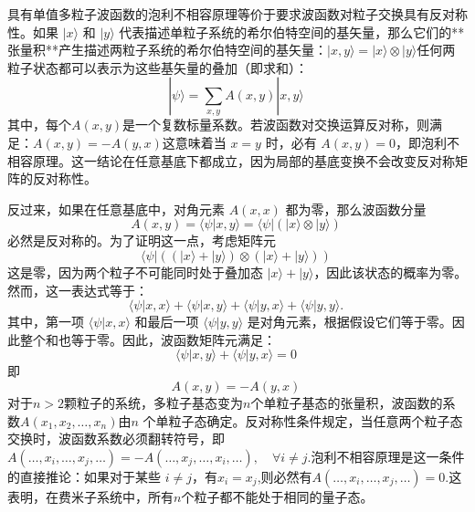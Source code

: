 具有单值多粒子波函数的泡利不相容原理等价于要求波函数对粒子交换具有反对称性。如果 \( |x\rangle \) 和 \( |y\rangle \) 代表描述单粒子系统的希尔伯特空间的基矢量，那么它们的**张量积**产生描述两粒子系统的希尔伯特空间的基矢量：\(|x, y\rangle = |x\rangle \otimes |y\rangle\)任何两粒子状态都可以表示为这些基矢量的叠加（即求和）：  
\[
|\psi\rangle = \sum_{x,y} A(x,y) |x,y\rangle~
\]
其中，每个\(A(x, y)\)是一个复数标量系数。若波函数对交换运算反对称，则满足：\(A(x, y) = -A(y, x)\)这意味着当 \( x = y \) 时，必有 \( A(x, y) = 0 \)，即泡利不相容原理。这一结论在任意基底下都成立，因为局部的基底变换不会改变反对称矩阵的反对称性。

反过来，如果在任意基底中，对角元素 \( A(x, x) \) 都为零，那么波函数分量  
\[
A(x, y) = \langle \psi | x, y \rangle = \langle \psi | ( |x\rangle \otimes |y\rangle )~
\]
必然是反对称的。为了证明这一点，考虑矩阵元  
\[
\langle \psi | ( (|x\rangle + |y\rangle ) \otimes (|x\rangle + |y\rangle ) )~
\]
这是零，因为两个粒子不可能同时处于叠加态 \( |x\rangle + |y\rangle \)，因此该状态的概率为零。然而，这一表达式等于：  
\[
\langle \psi | x, x \rangle + \langle \psi | x, y \rangle + \langle \psi | y, x \rangle + \langle \psi | y, y \rangle.~
\]
其中，第一项 \( \langle \psi | x, x \rangle \) 和最后一项 \( \langle \psi | y, y \rangle \) 是对角元素，根据假设它们等于零。因此整个和也等于零。因此，波函数矩阵元满足：  
\[
\langle \psi | x, y \rangle + \langle \psi | y, x \rangle = 0~
\]
即  
\[
A(x, y) = -A(y, x)~
\]
对于\( n > 2 \)颗粒子的系统，多粒子基态变为\( n \)个单粒子基态的张量积，波函数的系数\(A(x_1, x_2, \dots, x_n)\)由\( n \) 个单粒子态确定。反对称性条件规定，当任意两个粒子态交换时，波函数系数必须翻转符号，即\(A(\dots, x_i, \dots, x_j, \dots) = -A(\dots, x_j, \dots, x_i, \dots), \quad \forall i \neq j\).泡利不相容原理是这一条件的直接推论：如果对于某些 \( i \neq j \)，有\(x_i = x_j\),则必然有\(A(\dots, x_i, \dots, x_j, \dots) = 0\).这表明，在费米子系统中，所有\( n \)个粒子都不能处于相同的量子态。